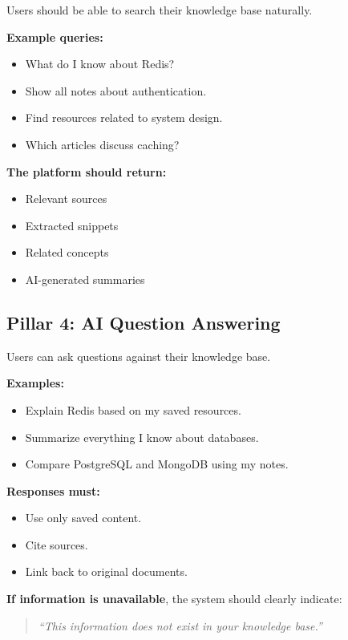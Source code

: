 \documentclass[11pt]{article}
\begin{document}
Users should be able to search their knowledge base naturally.

\textbf{Example queries:}
\begin{itemize}[nosep]
    \item What do I know about Redis?
    \item Show all notes about authentication.
    \item Find resources related to system design.
    \item Which articles discuss caching?
\end{itemize}

\textbf{The platform should return:}
\begin{itemize}[nosep]
    \item Relevant sources
    \item Extracted snippets
    \item Related concepts
    \item AI-generated summaries
\end{itemize}

\subsection{Pillar 4: AI Question Answering}

Users can ask questions against their knowledge base.

\textbf{Examples:}
\begin{itemize}[nosep]
    \item Explain Redis based on my saved resources.
    \item Summarize everything I know about databases.
    \item Compare PostgreSQL and MongoDB using my notes.
\end{itemize}

\textbf{Responses must:}
\begin{itemize}[nosep]
    \item Use only saved content.
    \item Cite sources.
    \item Link back to original documents.
\end{itemize}

\textbf{If information is unavailable}, the system should clearly indicate:

\begin{quote}
    \textit{``This information does not exist in your knowledge base.''}
\end{quote}
\end{document}
